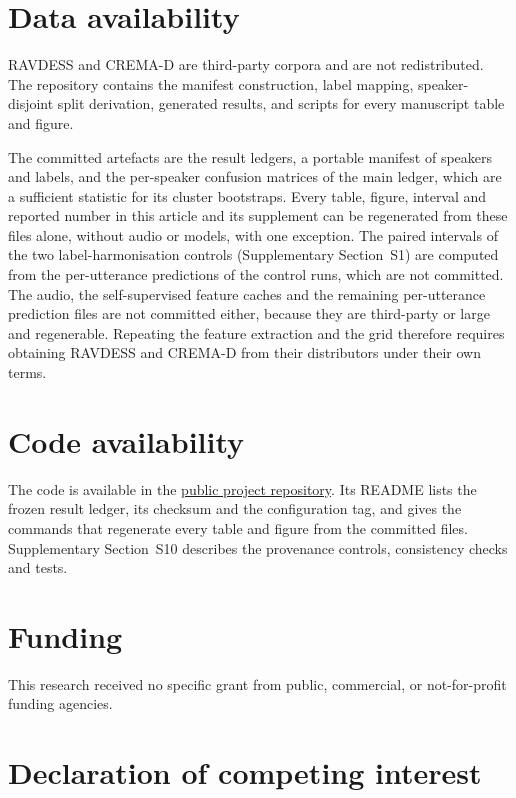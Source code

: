 \section*{Data availability}

RAVDESS \citep{livingstone2018ryerson} and CREMA-D \citep{cao2014crema} are
third-party corpora and are not redistributed. The repository contains the
manifest construction, label mapping, speaker-disjoint split derivation,
generated results, and scripts for every manuscript table and figure.

The committed artefacts are the result ledgers, a portable manifest of speakers
and labels, and the per-speaker confusion matrices of the main ledger, which
are a sufficient statistic for its cluster bootstraps. Every
table, figure, interval and reported number in this article and its supplement
can be regenerated from these files alone, without audio or models, with one
exception. The paired intervals of the two label-harmonisation controls
(Supplementary Section~S1) are computed from the per-utterance predictions of
the control runs, which are not committed. The audio, the self-supervised feature
caches and the remaining per-utterance prediction files are not committed
either, because they are third-party or large and regenerable. Repeating the
feature extraction and the grid therefore requires obtaining RAVDESS and
CREMA-D from their distributors under their own terms.

\section*{Code availability}

The code is available in the
\href{https://github.com/prashant290605/Speech-Emotion-Recognition}{public project repository}.
Its README lists the frozen result ledger, its checksum and the configuration
tag, and gives the commands that regenerate every table and figure from the
committed files. Supplementary Section~S10 describes the provenance controls,
consistency checks and tests.

\section*{Funding}

This research received no specific grant from public, commercial, or
not-for-profit funding agencies.

\section*{Declaration of competing interest}

